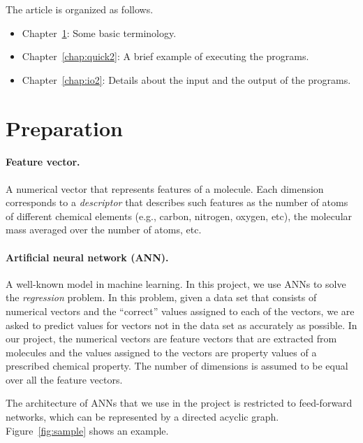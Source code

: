 \documentclass[11pt,titlepage,dvipdfmx,twoside]{book}
\newcommand{\chapref}[1]{Chapter~\ref{chap:#1}}
\newcommand{\figref}[1]{Figure~\ref{fig:#1}}
\begin{document}
The article is organized as follows. 
\begin{itemize}
\item \chapref{preparation2}: 
Some basic terminology. %
%
\item \chapref{quick2}: 
A brief example of executing the programs. 
%
\item \chapref{io2}: Details about the input and the output of the programs. 
\end{itemize}

\section{Preparation}
\label{chap:preparation2}

\paragraph{Feature vector.}
A numerical vector that represents features of a molecule.
Each dimension corresponds to a {\em descriptor} that describes
such features as the number of atoms of different 
chemical elements (e.g., carbon, nitrogen, oxygen, etc), the molecular mass
averaged over the number of atoms, etc.

\paragraph{Artificial neural network (ANN).}
A well-known model in machine learning.
In this project, we use ANNs to solve the {\em regression} problem.
In this problem, given a data set that consists of numerical vectors
and the ``correct'' values assigned to each of the vectors,
we are asked to predict values for vectors not in the data set
as accurately as possible.
In our project, the numerical vectors are feature vectors
that are extracted from molecules
and the values assigned to the vectors are property values
of a prescribed chemical property.
The number of dimensions is assumed to be equal
over all the feature vectors. 

The architecture of ANNs that we use in the project
is restricted to feed-forward networks, which can be represented by
a directed acyclic graph. \figref{sample} shows an example. 
\end{document}
